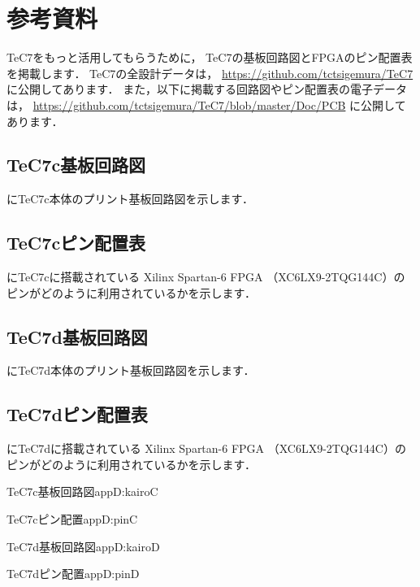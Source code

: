 \renewcommand{\myincludegraphics}[2]{\texttt{[image: appD/\#1]}}

\newpage
\onecolumn
\chapter{参考資料}

TeC7をもっと活用してもらうために，
TeC7の基板回路図とFPGAのピン配置表を掲載します．
TeC7の全設計データは，
\url{https://github.com/tctsigemura/TeC7}
に公開してあります．
また，以下に掲載する回路図やピン配置表の電子データは，
\url{https://github.com/tctsigemura/TeC7/blob/master/Doc/PCB}
に公開してあります．

\section{TeC7c基板回路図}
にTeC7c本体のプリント基板回路図を示します．

\section{TeC7cピン配置表}
にTeC7cに搭載されている
Xilinx Spartan-6 FPGA （XC6LX9-2TQG144C）の
ピンがどのように利用されているかを示します．

\section{TeC7d基板回路図}
にTeC7d本体のプリント基板回路図を示します．

\section{TeC7dピン配置表}
にTeC7dに搭載されている
Xilinx Spartan-6 FPGA （XC6LX9-2TQG144C）の
ピンがどのように利用されているかを示します．

\newpage
{}
           {TeC7c基板回路図}{appD:kairoC}

\newpage
{}
           {TeC7cピン配置}{appD:pinC}

\newpage
{}
           {TeC7d基板回路図}{appD:kairoD}

\newpage
{}
           {TeC7dピン配置}{appD:pinD}
